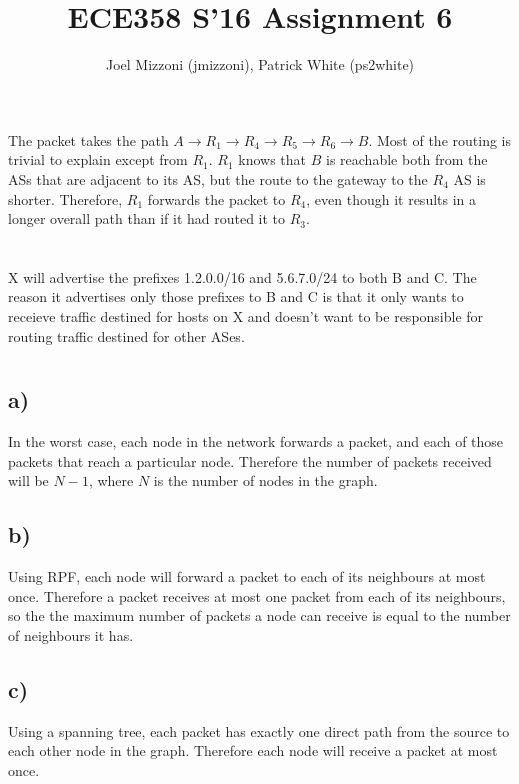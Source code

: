 \documentclass[10pt,a4paper]{article}
\author{Joel Mizzoni (jmizzoni), Patrick White (ps2white)}
\begin{document}
\title{ECE358 S'16 Assignment 6}
\maketitle
\section{}
The packet takes the path $A\rightarrow R_1 \rightarrow R_4 \rightarrow R_5 \rightarrow R_6 \rightarrow B$.
Most of the routing is trivial to explain except from $R_1$.
$R_1$ knows that $B$ is reachable both from the ASs that are adjacent to its AS, but the route to the gateway to the $R_4$ AS is shorter.
Therefore, $R_1$ forwards the packet to $R_4$, even though it results in a longer overall path than if it had routed it to $R_3$.
\section{}

X will advertise the prefixes 1.2.0.0/16 and 5.6.7.0/24 to both B and C. The reason it advertises only those prefixes to B and C is that it only wants to receieve traffic destined for hosts on X and doesn't want to be responsible for routing traffic destined for other ASes.
\section{}

\subsection{a)}
In the worst case, each node in the network forwards a packet, and each of those packets that reach a particular node. Therefore the number of packets received will be $N-1$, where $N$ is the number of nodes in the graph.

\subsection{b)}
Using RPF, each node will forward a packet to each of its neighbours at most once. Therefore a packet receives at most one packet from each of its neighbours, so the the maximum number of packets a node can receive is equal to the number of neighbours it has.

\subsection{c)}
Using a spanning tree, each packet has exactly one direct path from the source to each other node in the graph. Therefore each node will receive a packet at most once. 
\end{document}
